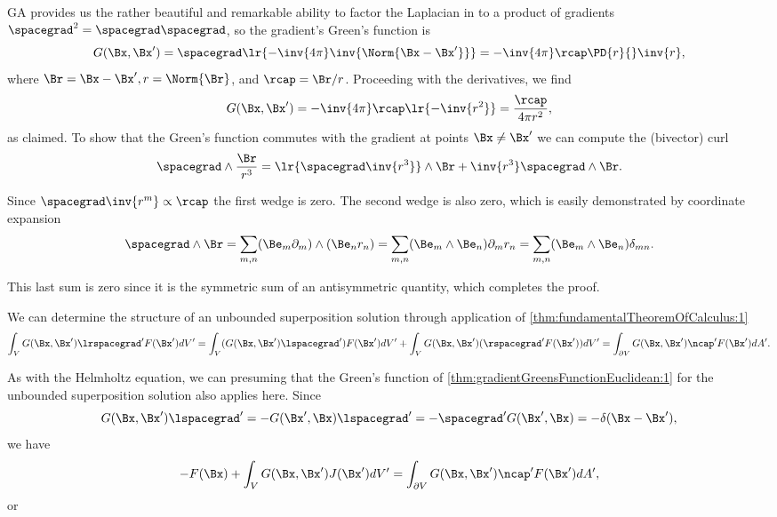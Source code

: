 GA provides us the rather beautiful and remarkable ability to factor the Laplacian in to a product of gradients \( \spacegrad^2 = \spacegrad \spacegrad \), so the gradient's Green's function is
\begin{dmath}\label{eqn:greensFunctionGradient:580}
G(\Bx, \Bx')
= \spacegrad \lr{ -\inv{4\pi} \inv{ \Norm{\Bx - \Bx'} } }
= -\inv{4\pi} \rcap \PD{r}{} \inv{r},
\end{dmath}
where \( \Br = \Bx - \Bx', r = \Norm{\Br} \), and \( \rcap = \Br/r \).  Proceeding with the derivatives, we find
\begin{dmath}\label{eqn:greensFunctionGradient:600}
G(\Bx, \Bx')
= -\inv{4\pi} \rcap \lr{ -\inv{r^2} }
= \frac{\rcap}{4 \pi r^2},
\end{dmath}
as claimed.  To show that the Green's function commutes with the gradient at points \( \Bx \ne \Bx' \) we can compute the (bivector) curl
\begin{dmath}\label{eqn:greensFunctionGradient:620}
\spacegrad \wedge \frac{\Br}{r^3}
=
\lr{ \spacegrad \inv{r^3}} \wedge \Br
+
\inv{r^3} \spacegrad \wedge \Br.
\end{dmath}

Since \( \spacegrad \inv{r^m} \propto \rcap \) the first wedge is zero.  The second wedge is also zero, which is easily demonstrated by coordinate expansion
\begin{dmath}\label{eqn:greensFunctionGradient:640}
\spacegrad \wedge \Br
=
\sum_{m,n} (\Be_m \partial_m) \wedge (\Be_n r_n)
=
\sum_{m,n} (\Be_m \wedge \Be_n) \partial_m r_n
=
\sum_{m,n} (\Be_m \wedge \Be_n) \delta_{m n}.
\end{dmath}

This last sum is zero since it is the symmetric sum of an antisymmetric quantity, which completes the proof.

We can determine the structure of an unbounded superposition solution through application of
\cref{thm:fundamentalTheoremOfCalculus:1}
\begin{dmath}\label{eqn:greensFunctionGradient:500}
\int_V G(\Bx, \Bx') \lrspacegrad' F(\Bx') dV'
=
\int_V (G(\Bx, \Bx') \lspacegrad') F(\Bx') dV'
+
\int_V G(\Bx, \Bx') (\rspacegrad' F(\Bx')) dV'
=
\int_{\partial V} G(\Bx, \Bx') \ncap' F(\Bx') dA'.
\end{dmath}

As with the Helmholtz equation, we can presuming that the Green's function of
\cref{thm:gradientGreensFunctionEuclidean:1}
for the unbounded superposition solution also applies here.  Since
\begin{dmath}\label{eqn:greensFunctionGradient:520}
G(\Bx, \Bx') \lspacegrad'
=
-G(\Bx', \Bx) \lspacegrad'
=
-
\spacegrad' G(\Bx', \Bx)
= -\delta(\Bx - \Bx'),
\end{dmath}
we have
\begin{dmath}\label{eqn:greensFunctionGradient:540}
-F(\Bx)
+
\int_V G(\Bx, \Bx') J(\Bx') dV'
=
\int_{\partial V} G(\Bx, \Bx') \ncap' F(\Bx') dA',
\end{dmath}
or

